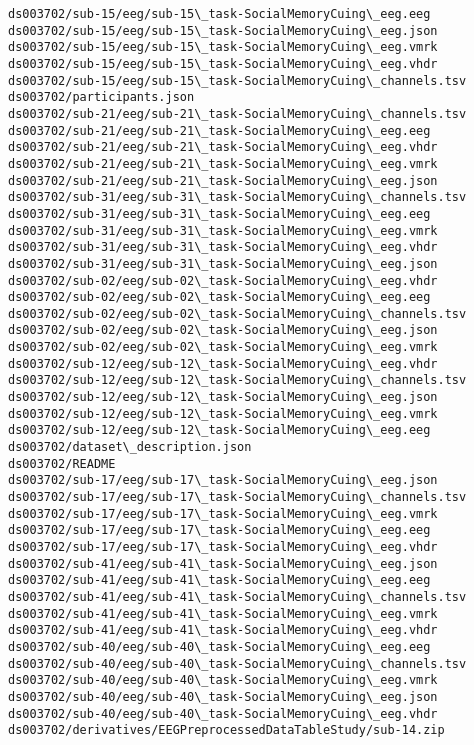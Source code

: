 \documentclass[11pt]{article}
\begin{document}
\begin{Verbatim}[commandchars=\\\{\}]
ds003702/sub-15/eeg/sub-15\_task-SocialMemoryCuing\_eeg.eeg
ds003702/sub-15/eeg/sub-15\_task-SocialMemoryCuing\_eeg.json
ds003702/sub-15/eeg/sub-15\_task-SocialMemoryCuing\_eeg.vmrk
ds003702/sub-15/eeg/sub-15\_task-SocialMemoryCuing\_eeg.vhdr
ds003702/sub-15/eeg/sub-15\_task-SocialMemoryCuing\_channels.tsv
ds003702/participants.json
ds003702/sub-21/eeg/sub-21\_task-SocialMemoryCuing\_channels.tsv
ds003702/sub-21/eeg/sub-21\_task-SocialMemoryCuing\_eeg.eeg
ds003702/sub-21/eeg/sub-21\_task-SocialMemoryCuing\_eeg.vhdr
ds003702/sub-21/eeg/sub-21\_task-SocialMemoryCuing\_eeg.vmrk
ds003702/sub-21/eeg/sub-21\_task-SocialMemoryCuing\_eeg.json
ds003702/sub-31/eeg/sub-31\_task-SocialMemoryCuing\_channels.tsv
ds003702/sub-31/eeg/sub-31\_task-SocialMemoryCuing\_eeg.eeg
ds003702/sub-31/eeg/sub-31\_task-SocialMemoryCuing\_eeg.vmrk
ds003702/sub-31/eeg/sub-31\_task-SocialMemoryCuing\_eeg.vhdr
ds003702/sub-31/eeg/sub-31\_task-SocialMemoryCuing\_eeg.json
ds003702/sub-02/eeg/sub-02\_task-SocialMemoryCuing\_eeg.vhdr
ds003702/sub-02/eeg/sub-02\_task-SocialMemoryCuing\_eeg.eeg
ds003702/sub-02/eeg/sub-02\_task-SocialMemoryCuing\_channels.tsv
ds003702/sub-02/eeg/sub-02\_task-SocialMemoryCuing\_eeg.json
ds003702/sub-02/eeg/sub-02\_task-SocialMemoryCuing\_eeg.vmrk
ds003702/sub-12/eeg/sub-12\_task-SocialMemoryCuing\_eeg.vhdr
ds003702/sub-12/eeg/sub-12\_task-SocialMemoryCuing\_channels.tsv
ds003702/sub-12/eeg/sub-12\_task-SocialMemoryCuing\_eeg.json
ds003702/sub-12/eeg/sub-12\_task-SocialMemoryCuing\_eeg.vmrk
ds003702/sub-12/eeg/sub-12\_task-SocialMemoryCuing\_eeg.eeg
ds003702/dataset\_description.json
ds003702/README
ds003702/sub-17/eeg/sub-17\_task-SocialMemoryCuing\_eeg.json
ds003702/sub-17/eeg/sub-17\_task-SocialMemoryCuing\_channels.tsv
ds003702/sub-17/eeg/sub-17\_task-SocialMemoryCuing\_eeg.vmrk
ds003702/sub-17/eeg/sub-17\_task-SocialMemoryCuing\_eeg.eeg
ds003702/sub-17/eeg/sub-17\_task-SocialMemoryCuing\_eeg.vhdr
ds003702/sub-41/eeg/sub-41\_task-SocialMemoryCuing\_eeg.json
ds003702/sub-41/eeg/sub-41\_task-SocialMemoryCuing\_eeg.eeg
ds003702/sub-41/eeg/sub-41\_task-SocialMemoryCuing\_channels.tsv
ds003702/sub-41/eeg/sub-41\_task-SocialMemoryCuing\_eeg.vmrk
ds003702/sub-41/eeg/sub-41\_task-SocialMemoryCuing\_eeg.vhdr
ds003702/sub-40/eeg/sub-40\_task-SocialMemoryCuing\_eeg.eeg
ds003702/sub-40/eeg/sub-40\_task-SocialMemoryCuing\_channels.tsv
ds003702/sub-40/eeg/sub-40\_task-SocialMemoryCuing\_eeg.vmrk
ds003702/sub-40/eeg/sub-40\_task-SocialMemoryCuing\_eeg.json
ds003702/sub-40/eeg/sub-40\_task-SocialMemoryCuing\_eeg.vhdr
ds003702/derivatives/EEGPreprocessedDataTableStudy/sub-14.zip

\end{Verbatim}
\end{document}
